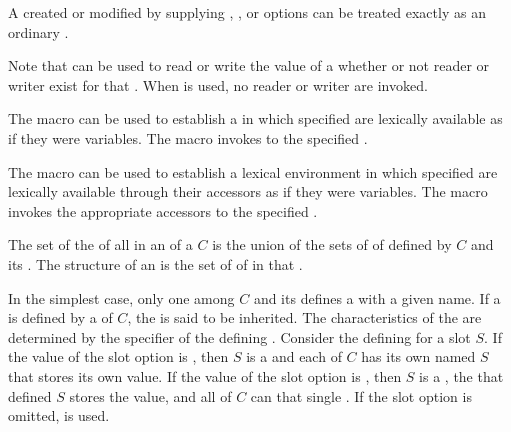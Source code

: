 A  created or modified by supplying ,
, or   options can be treated exactly
as an ordinary .
           
Note that  can be used to read or write the value of a
 whether or not reader or writer  exist for that
.  When  is used, no reader or writer
 are invoked.

The macro  can be used to establish a 
 in which specified  are lexically
available as if they were variables.  The macro  
invokes  to  the specified .

The macro  can be used to establish a lexical
environment in which specified  are lexically available through
their accessors as if they were variables.  The macro 
invokes the appropriate accessors to  the specified . 

\endsubSection%

The set of the  of all   
in an  of a  $C$ is the union of 
the sets of  of  defined by $C$ and its
. The structure of an  is
the set of  of  in that .

In the simplest case, only one  among $C$ and its 
defines a  with a given  name.  
If a  is defined by a  of $C$\negthinspace, 
the  is said to be inherited.  The characteristics 
of the  are determined by the  specifier 
of the defining .
Consider the defining  for
a slot $S$\negthinspace.  If the value of the  
slot
option is , then $S$ is a  and each 
of $C$ has its own  named $S$ that stores its own value.  If the
value of the  slot 
option is , then $S$
is a , the  
that defined $S$ stores the value, and all
 of $C$ can  that single .  
If the  slot option is omitted,  is used.


